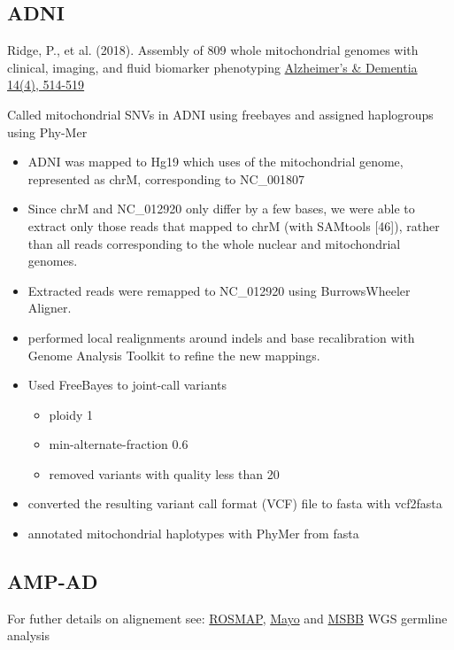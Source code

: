 \documentclass[]{book}
\providecommand{\tightlist}{%
  \setlength{\itemsep}{0pt}\setlength{\parskip}{0pt}}
\begin{document}
\hypertarget{adni}{%
\subsection{ADNI}\label{adni}}

Ridge, P., et al. (2018). Assembly of 809 whole mitochondrial genomes with clinical, imaging, and fluid biomarker phenotyping \href{https://dx.doi.org/10.1016/j.jalz.2017.11.013}{Alzheimer's \& Dementia 14(4), 514-519}

Called mitochondrial SNVs in ADNI using freebayes and assigned haplogroups using Phy-Mer

\begin{itemize}
\tightlist
\item
  ADNI was mapped to Hg19 which uses of the mitochondrial genome, represented as chrM, corresponding to NC\_001807
\item
  Since chrM and NC\_012920 only differ by a few bases, we were able to extract only those reads that mapped to chrM (with SAMtools {[}46{]}), rather than all reads corresponding to the whole nuclear and mitochondrial genomes.
\item
  Extracted reads were remapped to NC\_012920 using BurrowsWheeler Aligner.
\item
  performed local realignments around indels and base recalibration with Genome Analysis Toolkit to refine the new mappings.
\item
  Used FreeBayes to joint-call variants

  \begin{itemize}
  \tightlist
  \item
    ploidy 1
  \item
    min-alternate-fraction 0.6
  \item
    removed variants with quality less than 20
  \end{itemize}
\item
  converted the resulting variant call format (VCF) file to fasta with vcf2fasta
\item
  annotated mitochondrial haplotypes with PhyMer from fasta
\end{itemize}

\hypertarget{amp-ad}{%
\subsection{AMP-AD}\label{amp-ad}}

For futher details on alignement see: \href{https://www.synapse.org/\#!Synapse:syn10901595}{ROSMAP}, \href{https://www.synapse.org/\#!Synapse:syn10901601}{Mayo} and \href{https://www.synapse.org/\#!Synapse:syn10901600}{MSBB} WGS germline analysis
\end{document}
